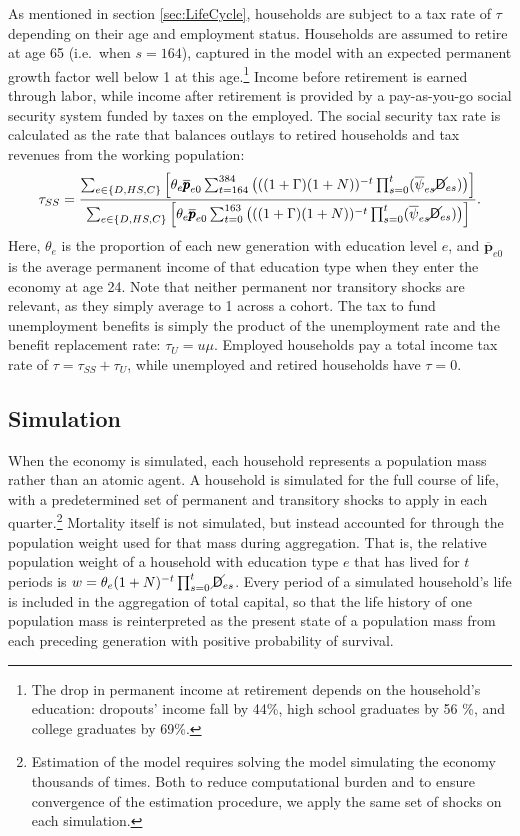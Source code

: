 \documentclass[11pt,a4paper,pdftex]{article}\usepackage[pdftex]{graphicx}\usepackage{epstopdf} \usepackage[pdftex]{hyperref}
\newcommand{\PDies}{\ensuremath{\mathsf{D}}}
\newcommand{\pLev}{\ensuremath{\pmb{p}}}
\newcommand{\PLives}{\ensuremath{\cancel{\PDies}}}
\newcommand{\pshk}{\psi} %
\newcommand{\urate}{\ensuremath{u}}
\begin{document}
As mentioned in section \ref{sec:LifeCycle}, households are subject to a tax rate of $\tau$ depending on their age and employment status.  Households are assumed to retire at age 65 (i.e.\ when $s = 164$), captured in the model with an expected permanent growth factor well below 1 at this age.\footnote{The drop in permanent income at retirement depends on the household's education: dropouts' income fall by 44\%, high school graduates by 56 \%, and college graduates by 69\%.}  Income before retirement is earned through labor, while income after retirement is provided by a pay-as-you-go social security system funded by taxes on the employed.  The social security tax rate is calculated as the rate that balances outlays to retired households and tax revenues from the working population:
\begin{equation*}
\tau_{SS} = \frac{\sum_{e \in \{D,HS,C\}} \Big[ \theta_e \overline{\pLev}_{e0} \sum_{t = 164}^{384} \big( ((1 + \Gamma)(1+N))^{-t} \prod_{s=0}^t ( \overline{\pshk}_{es} \PLives_{es} ) \big) \Big]}
{\sum_{e \in \{D,HS,C\}} \Big[ \theta_e \overline{\pLev}_{e0} \sum_{t = 0}^{163} \big( ((1 + \Gamma)(1+N) )^{-t} \prod_{s=0}^t ( \overline{\pshk}_{es} \PLives_{es} ) \big) \Big]}.
\end{equation*}
Here, $\theta_e$ is the proportion of each new generation with education level $e$, and $\overline{\pLev}_{e0}$ is the average permanent income of that education type when they enter the economy at age 24.  Note that neither permanent nor transitory shocks are relevant, as they simply average to 1 across a cohort.  The tax to fund unemployment benefits is simply the product of the unemployment rate and the benefit replacement rate: $\tau_U = \urate \mu$.  Employed households pay a total income tax rate of $\tau = \tau_{SS} + \tau_U$, while unemployed and retired households have $\tau = 0$.

\subsection{Simulation}

When the economy is simulated, each household represents a population mass rather than an atomic agent.  A household is simulated for the full course of life, with a predetermined set of permanent and transitory shocks to apply in each quarter.\footnote{Estimation of the model requires solving the model simulating the economy thousands of times.  Both to reduce computational burden and to ensure convergence of the estimation procedure, we apply the same set of shocks on each simulation.}  Mortality itself is not simulated, but instead accounted for through the population weight used for that mass during aggregation.  That is, the relative population weight of a household with education type $e$ that has lived for $t$ periods is $w = \theta_e (1 + N)^{-t} \prod_{s=0}^t \PLives_{es}$.  Every period of a simulated household's life is included in the aggregation of total capital, so that the life history of one population mass is reinterpreted as the present state of a population mass from each preceding generation with positive probability of survival.
\end{document}
